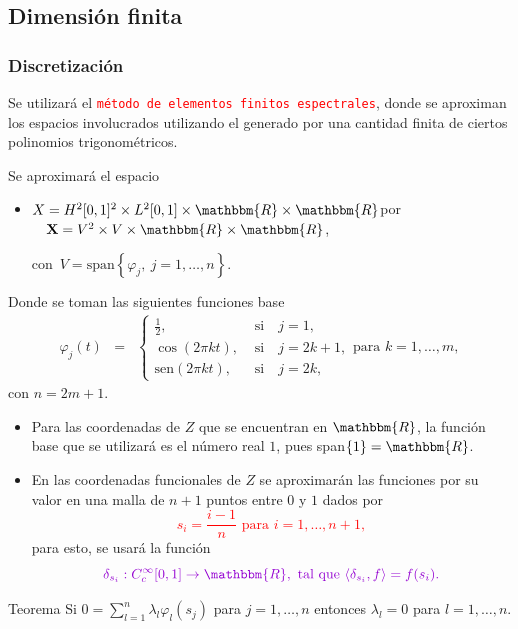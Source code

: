 \documentclass[10pt,mathserif]{beamer}
\newcommand{\R}{\mathbbm{R}}
\newcommand{\arr}{\rightarrow}
\newcommand{\la}{\langle}
\newcommand{\ra}{\rangle}
\begin{document}
\subsection{Dimensión finita}
\begin{frame}
\frametitle{Discretización}

Se utilizará el \textcolor{red}{\texttt{método de elementos finitos espectrales}}, donde se aproximan los espacios involucrados utilizando el generado por una cantidad finita de ciertos polinomios trigonométricos. 


Se aproximará el espacio 
\begin{itemize}
    \item $X=H^2[0,1]^2\times L^2[0,1]\times \R \times \R$\quad por $\quad\textbf{X}=V^2\times V\times \R\times \R$,
    
    con $\, V=\mbox{span}\left\{\varphi_j,\ j=1,\ldots, n\right\}$.
\end{itemize}

Donde se toman las siguientes funciones base
\begin{eqnarray}\label{funbase}
\varphi_j(t)&=&\left\{ \begin{array}{ll}
\frac{1}{2}, & \mbox{ si}\quad j=1,\\
\cos(2\pi kt), & \mbox{ si}\quad j=2k+1,\\
\mathrm{sen}(2\pi kt), & \mbox{ si}\quad j=2k,
\end{array}
\right.\mbox{para } k=1,\ldots,m,
\end{eqnarray}
con $n=2m+1$. 
\end{frame}
\begin{frame}
\begin{itemize}
    \item Para las coordenadas de $Z$ que se encuentran en $\R$, la función base que se utilizará es el número real $1$, pues span$\{1\}=\R$.
    \item En las coordenadas funcionales de $Z$ se aproximarán las funciones por su valor en una malla de $n+1$ puntos entre $0$ y $1$ dados por 
    \textcolor{red}{$$s_i=\frac{i-1}{n} \mbox{ para } i=1,\ldots,n+1,$$}
     para esto, se usará la función 
     $$\textcolor{mymauve}{\delta_{s_i}:C_c^\infty[0,1]\arr\R, \mbox{ tal que } \la\delta_{s_i},f\ra=f(s_i).}$$
     
\end{itemize}

 \pause

\begin{block}{Teorema}
Si $0=\displaystyle\sum_{l=1}^n\lambda_l\varphi_l(s_j)$ para $j=1,\ldots,n$ entonces $\lambda_l=0$ para $l=1,\ldots,n$.
\end{block}

\end{frame}
\end{document}
